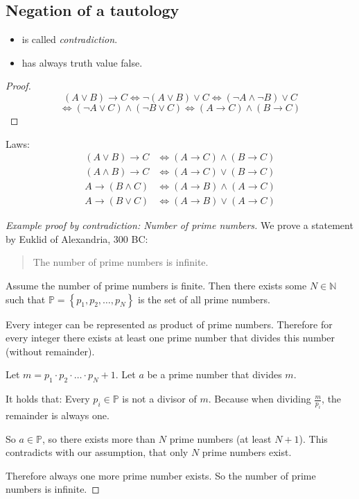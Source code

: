\documentclass[a4paper,landscape,twocolumn]{article}
\theoremstyle{definition}
\newcommand\set[1]{\left\{#1\right\}}
\begin{document}
\subsection{Negation of a tautology}
\begin{itemize}
  \item is called \emph{contradiction}.
  \item has always truth value false.
\end{itemize}

\begin{proof}
  \[ (A \lor B) \rightarrow C \Leftrightarrow \neg (A \lor B) \lor C \Leftrightarrow (\neg A \land \neg B) \lor C \]
  \[ \iff (\neg A \lor C) \land (\neg B \lor C) \Leftrightarrow (A \rightarrow C) \land (B \rightarrow C) \]
\end{proof}

Laws:
\begin{align*}
  (A \lor B) \rightarrow C &\Leftrightarrow (A \rightarrow C) \land (B \rightarrow C) \\
  (A \land B) \rightarrow C &\Leftrightarrow (A \rightarrow C) \lor (B \rightarrow C) \\
  A \rightarrow (B \land C) &\Leftrightarrow (A \rightarrow B) \land (A \rightarrow C) \\
  A \rightarrow (B \lor C) &\Leftrightarrow (A \rightarrow B) \lor (A \rightarrow C)
\end{align*}

\begin{proof}[Example proof by contradiction: Number of prime numbers]
  We prove a statement by Euklid of Alexandria, 300 BC:
  \begin{quote}
    The number of prime numbers is infinite.
  \end{quote}

  Assume the number of prime numbers is finite.
  Then there exists some $N \in \mathbb N$ such that $\mathbb P = \set{p_1, p_2, \ldots, p_N}$
  is the set of all prime numbers.

  Every integer can be represented as product of prime numbers.
  Therefore for every integer there exists at least one prime number that divides this number (without remainder).

  Let $m = p_1 \cdot p_2 \cdot \ldots \cdot p_N + 1$.
  Let $a$ be a prime number that divides $m$.

  It holds that: Every $p_i \in \mathbb P$ is not a divisor of $m$.
  Because when dividing $\frac{m}{p_i}$, the remainder is always one.

  So $a \in \mathbb P$, so there exists more than $N$ prime numbers (at least $N+1$).
  This contradicts with our assumption, that only $N$ prime numbers exist.

  Therefore always one more prime number exists. So the number of prime numbers is infinite.
\end{proof}
\end{document}
